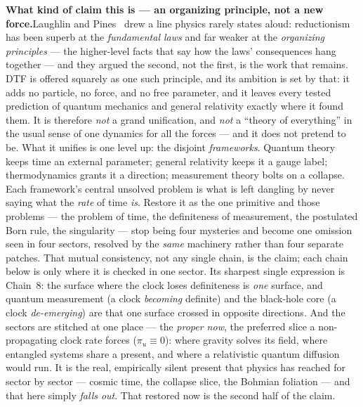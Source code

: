 \documentclass[11pt]{article}
\begin{document}
\begin{tcolorbox}
\textbf{What kind of claim this is --- an organizing principle, not a new force.}\enspace Laughlin and
Pines~\cite{LaughlinPines2000} drew a line physics rarely states aloud: reductionism has been superb at the
\emph{fundamental laws} and far weaker at the \emph{organizing principles} --- the higher-level facts that
say how the laws' consequences hang together --- and they argued the second, not the first, is the work that
remains. DTF is offered squarely as one such principle, and its ambition is set by that: it adds no
particle, no force, and no free parameter, and it leaves every tested prediction of quantum mechanics and
general relativity exactly where it found them. It is therefore \emph{not} a grand unification, and
\emph{not} a ``theory of everything'' in the usual sense of one dynamics for all the forces --- and it does
not pretend to be.
\smallskip
\noindent What it unifies is one level up: the disjoint \emph{frameworks}. Quantum theory keeps time an
external parameter; general relativity keeps it a gauge label; thermodynamics grants it a direction;
measurement theory bolts on a collapse. Each framework's central unsolved problem is what is left dangling
by never saying what the \emph{rate} of time \emph{is}. Restore it as the one primitive and those problems
--- the problem of time, the definiteness of measurement, the postulated Born rule, the singularity ---
stop being four mysteries and become one omission seen in four sectors, resolved by the \emph{same}
machinery rather than four separate patches. That mutual consistency, not any single chain, is the claim;
each chain below is only where it is checked in one sector. Its sharpest single expression is Chain~8: the
surface where the clock loses definiteness is \emph{one} surface, and quantum measurement (a clock
\emph{becoming} definite) and the black-hole core (a clock \emph{de-emerging}) are that one surface crossed
in opposite directions. And the sectors are stitched at one place --- the \emph{proper now}, the preferred
slice a non-propagating clock rate forces ($\pi_u\equiv0$): where gravity solves its field, where entangled
systems share a present, and where a relativistic quantum diffusion would run. It is the real, empirically
silent present that physics has reached for sector by sector --- cosmic time, the collapse slice, the
Bohmian foliation --- and that here simply \emph{falls out}. That restored now is the second half of the
claim.
\end{tcolorbox}
\end{document}

